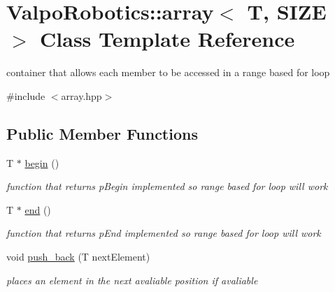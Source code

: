 \hypertarget{class_valpo_robotics_1_1array}{}\section{Valpo\+Robotics\+:\+:array$<$ T, S\+I\+ZE $>$ Class Template Reference}
\label{class_valpo_robotics_1_1array}


container that allows each member to be accessed in a range based for loop  




{\ttfamily \#include $<$array.\+hpp$>$}

\subsection*{Public Member Functions}
\begin{DoxyCompactItemize}
\item 
\mbox{\label{class_valpo_robotics_1_1array_ad1673d960bb1108221b2e5cb71dc1134}} 
T $\ast$ \mbox{\hyperlink{class_valpo_robotics_1_1array_ad1673d960bb1108221b2e5cb71dc1134}{begin}} ()
\begin{DoxyCompactList}\small\item\em function that returns p\+Begin implemented so range based for loop will work \end{DoxyCompactList}\item 
\mbox{\label{class_valpo_robotics_1_1array_a8b00881ddaed31c468e80020b275fe40}} 
T $\ast$ \mbox{\hyperlink{class_valpo_robotics_1_1array_a8b00881ddaed31c468e80020b275fe40}{end}} ()
\begin{DoxyCompactList}\small\item\em function that returns p\+End implemented so range based for loop will work \end{DoxyCompactList}\item 
\mbox{\label{class_valpo_robotics_1_1array_ab0d7f3c67b7928bd11b0fab2e5970d55}} 
void \mbox{\hyperlink{class_valpo_robotics_1_1array_ab0d7f3c67b7928bd11b0fab2e5970d55}{push\+\_\+back}} (T next\+Element)
\begin{DoxyCompactList}\small\item\em places an element in the next avaliable position if avaliable \end{DoxyCompactList}\end{DoxyCompactItemize}
